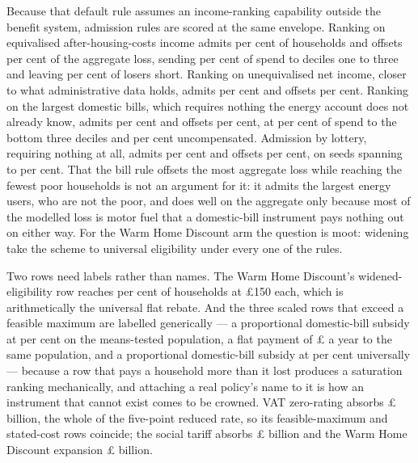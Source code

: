Because that default rule assumes an income-ranking capability outside the benefit system, \genSocialTariffAdmissionRuleCount{} admission rules are scored at the same envelope. Ranking on equivalised after-housing-costs income admits \genSocialTariffAdmissionAhcEligibleSharePct{} per cent of households and offsets \genSocialTariffAdmissionAhcOffsetPct{} per cent of the aggregate loss, sending \genSocialTariffAdmissionAhcBottomThreePct{} per cent of spend to deciles one to three and leaving \genSocialTariffAdmissionAhcUncompensatedPct{} per cent of losers short. Ranking on unequivalised net income, closer to what administrative data holds, admits \genSocialTariffAdmissionNetIncomeEligibleSharePct{} per cent and offsets \genSocialTariffAdmissionNetIncomeOffsetPct{} per cent. Ranking on the largest domestic bills, which requires nothing the energy account does not already know, admits \genSocialTariffAdmissionBillEligibleSharePct{} per cent and offsets \genSocialTariffAdmissionBillOffsetPct{} per cent, at \genSocialTariffAdmissionBillBottomThreePct{} per cent of spend to the bottom three deciles and \genSocialTariffAdmissionBillUncompensatedPct{} per cent uncompensated. Admission by lottery, requiring nothing at all, admits \genSocialTariffAdmissionRandomEligibleSharePct{} per cent and offsets \genSocialTariffAdmissionRandomOffsetPct{} per cent, on \genSocialTariffAdmissionRandomSeedCount{} seeds spanning \genSocialTariffAdmissionRandomOffsetMinPct{} to \genSocialTariffAdmissionRandomOffsetMaxPct{} per cent. That the bill rule offsets the most aggregate loss while reaching the fewest poor households is not an argument for it: it admits the largest energy users, who are not the poor, and does well on the aggregate only because most of the modelled loss is motor fuel that a domestic-bill instrument pays nothing out on either way. For the Warm Home Discount arm the question is moot: widening \genWhdAdmissionUniversalUnderEveryRule{} take the scheme to universal eligibility under every one of the \genWhdAdmissionRuleCount{} rules.

Two rows need labels rather than names. The Warm Home Discount's widened-eligibility row reaches \genWhdEligibleSharePct{} per cent of households at \pounds 150 each, which is arithmetically the universal flat rebate. And the three scaled rows that exceed a feasible maximum are labelled generically --- a proportional domestic-bill subsidy at \genSocialTariffScaledParameterPct{} per cent on the means-tested population, a flat payment of \pounds \genWhdScaledParameterGbp{} a year to the same population, and a proportional domestic-bill subsidy at \genVatCutScaledParameterPct{} per cent universally --- because a row that pays a household more than it lost produces a saturation ranking mechanically, and attaching a real policy's name to it is how an instrument that cannot exist comes to be crowned. VAT zero-rating absorbs \pounds \genVatCutCostBn{} billion, the whole of the five-point reduced rate, so its feasible-maximum and stated-cost rows coincide; the social tariff absorbs \pounds \genSocialTariffAbsorbableBn{} billion and the Warm Home Discount expansion \pounds \genWhdAbsorbableBn{} billion.

